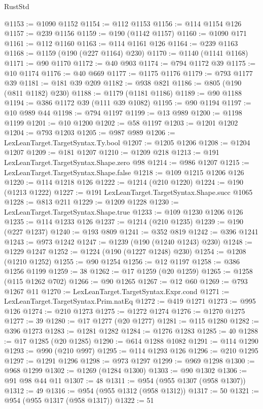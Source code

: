 \begin{lexlean}{RustStd}
\begin{coremodule}
@1153 := @1090 @1152
@1154 := @112 @1153
@1156 := @114 @1154 @126
@1157 := @239 @1156
@1159 := @190 (@1142 @1157)
@1160 := @1090 @171
@1161 := @112 @1160
@1163 := @114 @1161 @126
@1164 := @239 @1163
@1168 := @1159 (@190 (@227 @1164) @230)
@1170 := @1140 (@1141 @1168)
@1171 := @90 @1170
@1172 := @40 @903
@1174 := @794 @1172 @39
@1175 := @10 @1174
@1176 := @40 @669
@1177 := @1175 @1176
@1179 := @793 @1177 @39
@1181 := @181 @39 @209
@1182 := @938 @821
@1186 := @805 (@190 (@811 @1182) @230)
@1188 := @1179 (@1181 @1186)
@1189 := @90 @1188
@1194 := @386 @1172 @39 (@111 @39 @1082)
@1195 := @90 @1194
@1197 := @10 @989 @44
@1198 := @794 @1197
@1199 := @13 @989
@1200 := @1198 @1199
@1201 := @10 @1200
@1202 := @58 @1197
@1203 := @1201 @1202
@1204 := @793 @1203
@1205 := @987 @989
@1206 := LexLeanTarget.TargetSyntax.Ty.bool
@1207 := @1205 @1206
@1208 := @1204 @1207
@1209 := @181 @1207
@1210 := @1209 @218
@1213 := @191 LexLeanTarget.TargetSyntax.Shape.zero @98
@1214 := @986 @1207
@1215 := LexLeanTarget.TargetSyntax.Shape.false
@1218 := @109 @1215 @1206 @126
@1220 := @114 @1218 @126
@1222 := @1214 (@210 @1220)
@1224 := @190 (@1213 @1222)
@1227 := @191 LexLeanTarget.TargetSyntax.Shape.succ @1065
@1228 := @813 @211
@1229 := @1209 @1228
@1230 := LexLeanTarget.TargetSyntax.Shape.true
@1233 := @109 @1230 @1206 @126
@1235 := @114 @1233 @126
@1237 := @1214 (@210 @1235)
@1239 := @190 (@227 @1237)
@1240 := @193 @809
@1241 := @352 @819
@1242 := @396 @1241
@1243 := @973 @1242
@1247 := @1239 (@190 (@1240 @1243) @230)
@1248 := @1229 @1247
@1252 := @1224 (@190 (@1227 @1248) @230)
@1254 := @1208 (@1210 @1252)
@1255 := @90 @1254
@1256 := @12 @1197
@1258 := @386 @1256 @1199
@1259 := 38
@1262 := @17 @1259 (@20 @1259)
@1265 := @1258 (@115 @1262 @702)
@1266 := @90 @1265
@1267 := @12 @60
@1269 := @793 @1267 @11
@1270 := LexLeanTarget.TargetSyntax.Expr.cond
@1271 := LexLeanTarget.TargetSyntax.Prim.natEq
@1272 := @419 @1271
@1273 := @995 @126
@1274 := @210 @1273
@1275 := @1272 @1274
@1276 := @1270 @1275
@1277 := 39
@1280 := @17 @1277 (@20 @1277)
@1281 := @115 @1280
@1282 := @396 @1273
@1283 := @1281 @1282
@1284 := @1276 @1283
@1285 := 40
@1288 := @17 @1285 (@20 @1285)
@1290 := @614 @1288 @1082
@1291 := @114 @1290
@1293 := @990 (@210 @997)
@1295 := @114 @1293 @126
@1296 := @210 @1295
@1297 := @1291 @1296
@1298 := @973 @1297
@1299 := @969 @1298
@1300 := @968 @1299
@1302 := @1269 (@1284 @1300)
@1303 := @90 @1302
@1306 := @91 @98 @44 @11
@1307 := 48
@1311 := @954 (@955 @1307 (@958 @1307))
@1312 := 49
@1316 := @954 (@955 @1312 (@958 @1312))
@1317 := 50
@1321 := @954 (@955 @1317 (@958 @1317))
@1322 := 51

\end{coremodule}
\end{lexlean}
